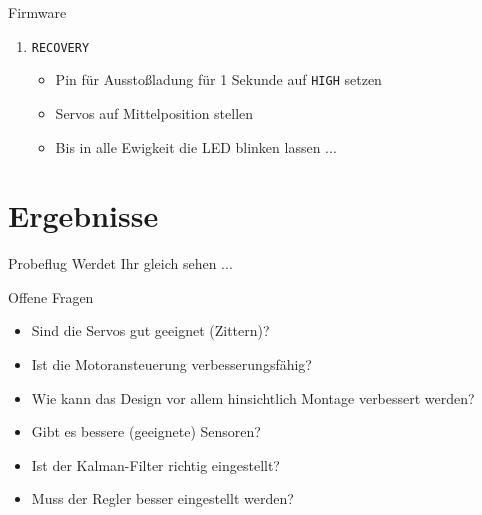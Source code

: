 \documentclass{beamer}
\newcounter{saveenumi}
\newcommand{\conti}{\setcounter{enumi}{\value{saveenumi}}}
\begin{document}
\begin{frame}{Firmware}
\begin{enumerate}
\conti
\item \texttt{RECOVERY}
\begin{itemize}
\item Pin für Ausstoßladung für 1 Sekunde auf \texttt{HIGH} setzen
\item Servos auf Mittelposition stellen
\item Bis in alle Ewigkeit die LED blinken lassen ...
\end{itemize}
\end{enumerate}
\end{frame}

\section{Ergebnisse}

\begin{frame}{Probeflug}
Werdet Ihr gleich sehen ...
\end{frame}

\begin{frame}{Offene Fragen}
\begin{itemize}
\item Sind die Servos gut geeignet (Zittern)?
\item Ist die Motoransteuerung verbesserungsfähig?
\item Wie kann das Design vor allem hinsichtlich Montage verbessert werden?
\item Gibt es bessere (geeignete) Sensoren?
\item Ist der Kalman-Filter richtig eingestellt?
\item Muss der Regler besser eingestellt werden?
\end{itemize}
\end{frame}
\end{document}
